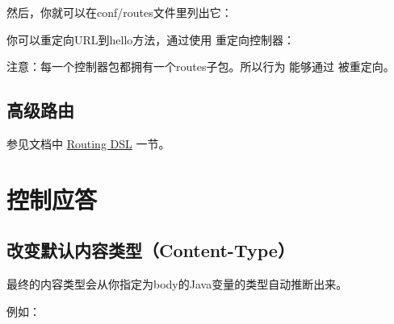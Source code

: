 \documentclass[letterpaper,10pt,english]{sphinxmanual}
\begin{document}
然后，你就可以在conf/routes文件里列出它：

\begin{sphinxVerbatim}[commandchars=\\\{\}]
             
\end{sphinxVerbatim}

你可以重定向URL到hello方法，通过使用  重定向控制器：

\begin{sphinxVerbatim}[commandchars=\\\{\}]
   
   
     
\end{sphinxVerbatim}

注意：每一个控制器包都拥有一个routes子包。所以行为  能够通过  被重定向。


\subsection{高级路由}
\label{\detokenize{index:id31}}
参见文档中 \href{https://www.playframework.com/documentation/2.5.x/JavaRoutingDsl}{Routing DSL} 一节。


\section{控制应答}
\label{\detokenize{index:id32}}

\subsection{改变默认内容类型（Content-Type）}
\label{\detokenize{index:content-type}}
最终的内容类型会从你指定为body的Java变量的类型自动推断出来。

例如：

\begin{sphinxVerbatim}[commandchars=\\\{\}]
   
\end{sphinxVerbatim}
\end{document}
